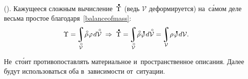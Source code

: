 \begin{otherlanguage}{russian}
\vspace{-0.25em}\noindent (). Кажущееся сложным вычисление~${\mathdotabove{\Upsilon}}$ (ведь $\mathcal{V}$ деформируется) на~с\'{а}мом деле весьма простое благодаря~\eqref{balanceofmass}:
\begin{equation}\label{volumeintegralinbothconfigurations}
\Upsilon = \hspace{-0.2ex} \integral\displaylimits_{\mathcircabove{\mathcal{V}}} \! \mathcircabove{\rho} \hspace{0.1ex} \varphi \hspace{0.2ex} d\mathcircabove{\mathcal{V}}
\;\Rightarrow\;
\mathdotabove{\Upsilon} = \hspace{-0.2ex} \integral\displaylimits_{\mathcircabove{\mathcal{V}}} \! \mathcircabove{\rho} \hspace{0.1ex} \mathdotabove{\varphi} \hspace{0.2ex} d\mathcircabove{\mathcal{V}} =
\hspace{-0.2ex} \integral\displaylimits_{\mathcal{V}} \! \rho \hspace{0.1ex} \mathdotabove{\varphi} \hspace{0.2ex} d\mathcal{V} .
\end{equation}

\vspace{-0.1em} Не~ст\'{о}ит противопоставлять материальное и~пространственное описания. Далее будут использоваться оба в~зависимости от~ситуации.

\end{otherlanguage}

\newpage



\label{para:motiongradient}

